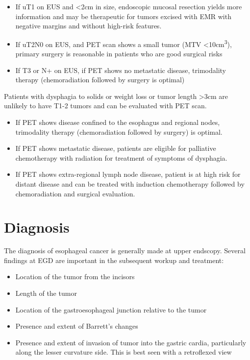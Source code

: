 \documentclass[
]{book}
\providecommand{\tightlist}{%
  \setlength{\itemsep}{0pt}\setlength{\parskip}{0pt}}
\begin{document}
\begin{itemize}
\tightlist
\item
  If uT1 on EUS and \textless2cm in size, endoscopic mucosal resection yields more information and may be therapeutic for tumors excised with EMR with negative margins and without high-risk features.
\item
  If uT2N0 on EUS, and PET scan shows a small tumor (MTV \textless10cm\textsuperscript{3}), primary surgery is reasonable in patients who are good surgical risks
\item
  If T3 or N+ on EUS, if PET shows no metastatic disease, trimodality therapy (chemoradiation followed by surgery is optimal)
\end{itemize}

Patients with dysphagia to solids or weight loss or tumor length \textgreater3cm are unlikely to have T1-2 tumors and can be evaluated with PET scan.

\begin{itemize}
\tightlist
\item
  If PET shows disease confined to the esophagus and regional nodes, trimodality therapy (chemoradiation followed by surgery) is optimal.
\item
  If PET shows metastatic disease, patients are eligible for palliative chemotherapy with radiation for treatment of symptoms of dysphagia.
\item
  If PET shows extra-regional lymph node disease, patient is at high risk for distant disease and can be treated with induction chemotherapy followed by chemoradiation and surgical evaluation.
\end{itemize}

\hypertarget{diagnosis}{%
\chapter{Diagnosis}\label{diagnosis}}

The diagnosis of esophageal cancer is generally made at upper endscopy. Several findings at EGD are important in the subsequent workup and treatment:

\begin{itemize}
\tightlist
\item
  Location of the tumor from the incisors
\item
  Length of the tumor
\item
  Location of the gastroesophageal junction relative to the tumor
\item
  Presence and extent of Barrett's changes
\item
  Presence and extent of invasion of tumor into the gastric cardia, particularly along the lesser curvature side. This is best seen with a retroflexed view
\end{itemize}
\end{document}
